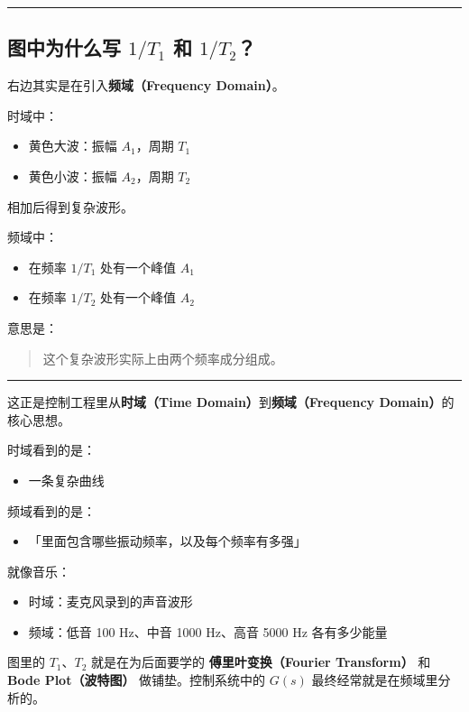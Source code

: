 \documentclass[UTF8,a4paper,11pt]{ctexart}
\begin{document}
\bigskip\noindent\rule{\linewidth}{0.4pt}\bigskip

\subsection{图中为什么写 $1/T_1$ 和 $1/T_2$？}

右边其实是在引入\textbf{频域（Frequency Domain）}。

时域中：

\begin{itemize}
  \item 黄色大波：振幅 $A_1$，周期 $T_1$
  \item 黄色小波：振幅 $A_2$，周期 $T_2$
\end{itemize}

相加后得到复杂波形。

频域中：

\begin{itemize}
  \item 在频率 $1/T_1$ 处有一个峰值 $A_1$
  \item 在频率 $1/T_2$ 处有一个峰值 $A_2$
\end{itemize}

意思是：

\begin{quote}
这个复杂波形实际上由两个频率成分组成。
\end{quote}

\bigskip\noindent\rule{\linewidth}{0.4pt}\bigskip

这正是控制工程里从\textbf{时域（Time Domain）}到\textbf{频域（Frequency Domain）}的核心思想。

时域看到的是：

\begin{itemize}
  \item 一条复杂曲线
\end{itemize}

频域看到的是：

\begin{itemize}
  \item 「里面包含哪些振动频率，以及每个频率有多强」
\end{itemize}

就像音乐：

\begin{itemize}
  \item 时域：麦克风录到的声音波形
  \item 频域：低音 100 Hz、中音 1000 Hz、高音 5000 Hz 各有多少能量
\end{itemize}

图里的 $T_1$、$T_2$ 就是在为后面要学的 \textbf{傅里叶变换（Fourier Transform）} 和 \textbf{Bode Plot（波特图）} 做铺垫。控制系统中的 $G(s)$ 最终经常就是在频域里分析的。
\end{document}

